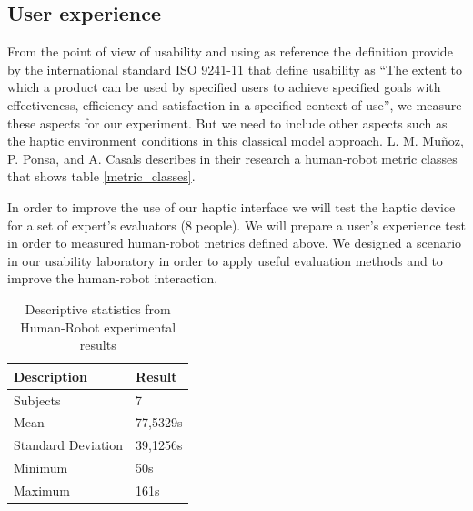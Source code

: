 \documentclass[journal,twoside]{JoPhA}
\begin{document}
\subsection{User experience}

From the point of view of usability and using as reference the definition provide by the international standard ISO 9241-11 \cite{ISO98} that define usability as “The extent to which a product can be used by specified users to achieve specified goals with effectiveness, efficiency and satisfaction in a specified context of use”, we measure these aspects for our experiment. But we need to include other aspects such as the haptic environment conditions in this classical model approach. L. M. Muñoz, P. Ponsa, and A. Casals \cite{Munoz12} describes in their research a human-robot metric classes that shows table \ref{metric_classes}.

\begin{table}[h]
\centering
\caption{\label{metric_classes}Human-Robot metric classes}
\end{table}

In order to improve the use of our haptic interface we will test the haptic device for a set of expert's evaluators (8 people). We will prepare a user's experience test in order to measured human-robot metrics defined above. We designed a scenario in our usability laboratory in order to apply useful evaluation methods and to improve the human-robot interaction.

\begin{table}[h]
	\centering
	\label{metric_test}
	\caption{Descriptive statistics from Human-Robot experimental results}
\begin{tabular}{  l  l }
	\hline
	Description & Result\\ 	\hline
	Subjects& 7\\ 	\hline
	Mean&	77,5329s  \\ 	\hline
	Standard Deviation&	39,1256s  \\	\hline 
	Minimum&	50s\\\hline
	Maximum&	161s\\\hline

\end{tabular}
\end{table}
\end{document}

